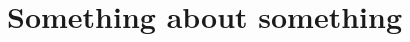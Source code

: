 \captionsetup*{format=largeformat}
\section{Something about something} \label{note:Note1}
\blindtext

